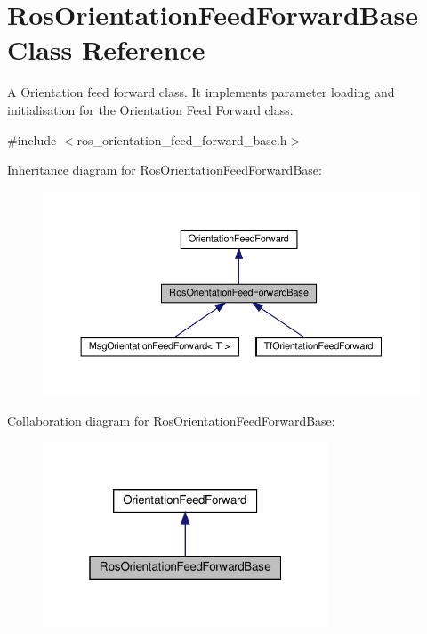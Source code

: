 \hypertarget{classRosOrientationFeedForwardBase}{}\section{Ros\+Orientation\+Feed\+Forward\+Base Class Reference}
\label{classRosOrientationFeedForwardBase}


A Orientation feed forward class. It implements parameter loading and initialisation for the Orientation Feed Forward class.  




{\ttfamily \#include $<$ros\+\_\+orientation\+\_\+feed\+\_\+forward\+\_\+base.\+h$>$}



Inheritance diagram for Ros\+Orientation\+Feed\+Forward\+Base\+:\nopagebreak
\begin{figure}[H]
\begin{center}
\leavevmode
\includegraphics[width=350pt]{dc/da0/classRosOrientationFeedForwardBase__inherit__graph}
\end{center}
\end{figure}


Collaboration diagram for Ros\+Orientation\+Feed\+Forward\+Base\+:\nopagebreak
\begin{figure}[H]
\begin{center}
\leavevmode
\includegraphics[width=241pt]{d6/d67/classRosOrientationFeedForwardBase__coll__graph}
\end{center}
\end{figure}
